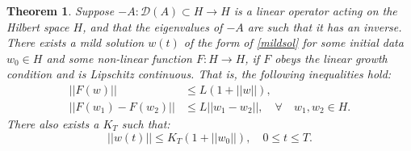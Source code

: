 \documentclass[12pt]{article}
\newtheorem{theorem}{Theorem}[section]
\begin{document}
\begin{theorem}\cite{Lord}
Suppose $-A:\mathcal{D}(A)\subset H \to H$ is a linear operator acting on the Hilbert space $H$, and that the eigenvalues of $-A$ are such that it has an inverse. There exists a mild solution $w(t)$ of the form of \eqref{mildsol} for some initial data $w_0 \in H$ and some non-linear function $F:H\to H$, if $F$ obeys the linear growth condition and is Lipschitz continuous. That is, the following inequalities hold:
\begin{align}\label{continuity}
||F(w)|| &\leq L(1+||w||),\\
\label{Lipcont}
||F(w_1) - F(w_2)|| &\leq L||w_1-w_2||, \quad \forall \quad w_1, w_2 \in H.
\end{align}
There also exists a $K_T$ such that:
\begin{equation} \label{existence}
||w(t)|| \leq K_T(1+||w_0||), \quad 0\leq t\leq T.
\end{equation}
\end{theorem}
\end{document}

